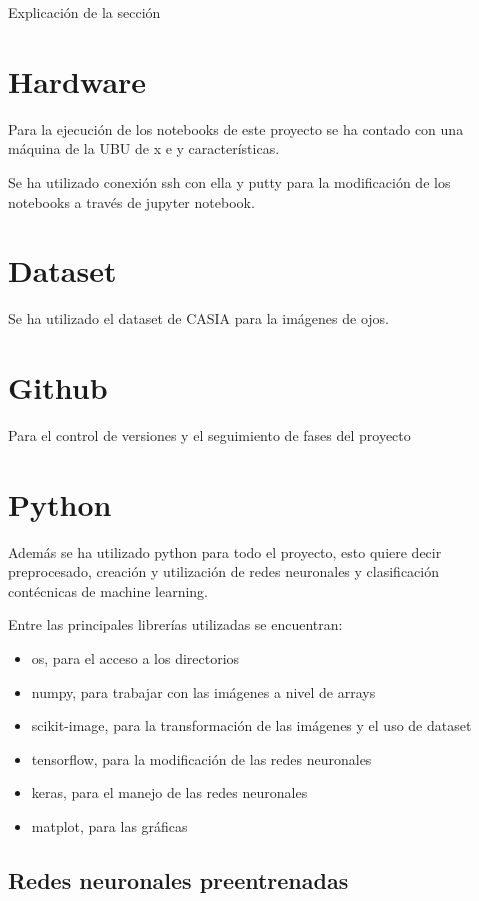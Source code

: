  \label{capitulo4}

Explicación de la sección

\section{Hardware}

Para la ejecución de los notebooks de este proyecto se ha contado con una máquina de la UBU de x e y características.

Se ha utilizado conexión ssh con ella y putty para la modificación de los notebooks a través de jupyter notebook.

\section{Dataset}

Se ha utilizado el dataset de CASIA para la imágenes de ojos.

\section{Github}
Para el control de versiones y el seguimiento de fases del proyecto

\section{Python}

Además se ha utilizado python para todo el proyecto, esto quiere decir preprocesado, creación y utilización de redes neuronales y clasificación contécnicas de 
machine learning.

Entre las principales librerías utilizadas se encuentran:

\begin{itemize}
    \item os, para el acceso a los directorios
    \item numpy, para trabajar con las imágenes a nivel de arrays
    \item scikit-image, para la transformación de las imágenes y el uso de dataset
    \item tensorflow, para la modificación de las redes neuronales
    \item keras, para el manejo de las redes neuronales
    \item matplot, para las gráficas
\end{itemize}

\subsection{Redes neuronales preentrenadas}

